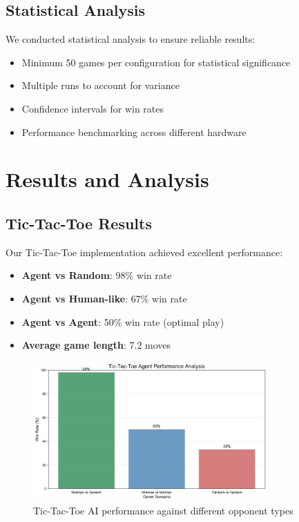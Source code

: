 \documentclass[12pt]{article}
\begin{document}
\subsection{Statistical Analysis}

We conducted statistical analysis to ensure reliable results:
\begin{itemize}
    \item Minimum 50 games per configuration for statistical significance
    \item Multiple runs to account for variance
    \item Confidence intervals for win rates
    \item Performance benchmarking across different hardware
\end{itemize}

\section{Results and Analysis}

\subsection{Tic-Tac-Toe Results}

Our Tic-Tac-Toe implementation achieved excellent performance:
\begin{itemize}
    \item \textbf{Agent vs Random}: 98\% win rate
\item \textbf{Agent vs Human-like}: 67\% win rate
\item \textbf{Agent vs Agent}: 50\% win rate (optimal play)
    \item \textbf{Average game length}: 7.2 moves
\end{itemize}

\begin{figure}[H]
\centering
\includegraphics[width=0.8\textwidth]{output/images/tic_tac_toe_win_rates.png}
\caption{Tic-Tac-Toe AI performance against different opponent types}
\label{fig:ttt_win_rates}
\end{figure}
\end{document}
